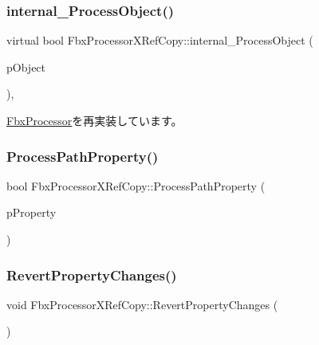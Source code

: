 \subsubsection{\texorpdfstring{internal\+\_\+\+Process\+Object()}{internal\_ProcessObject()}}
{\footnotesize\ttfamily virtual bool Fbx\+Processor\+X\+Ref\+Copy\+::internal\+\_\+\+Process\+Object (\begin{DoxyParamCaption}\item[{\hyperlink{class_fbx_object}{Fbx\+Object} $\ast$}]{p\+Object }\end{DoxyParamCaption})\hspace{0.3cm}{\ttfamily [protected]}, {\ttfamily [virtual]}}



\hyperlink{class_fbx_processor_ac549e7e8c678383831be8789a7c4ccdb}{Fbx\+Processor}を再実装しています。

\mbox{\label{class_fbx_processor_x_ref_copy_af29ec1373d66383d6b9140421c4c0166}} 
\subsubsection{\texorpdfstring{Process\+Path\+Property()}{ProcessPathProperty()}}
{\footnotesize\ttfamily bool Fbx\+Processor\+X\+Ref\+Copy\+::\+Process\+Path\+Property (\begin{DoxyParamCaption}\item[{\hyperlink{class_fbx_property}{Fbx\+Property} \&}]{p\+Property }\end{DoxyParamCaption})\hspace{0.3cm}{\ttfamily [protected]}}

\mbox{\label{class_fbx_processor_x_ref_copy_acb594ac9c10bdc9cf32efb2a64840654}} 
\subsubsection{\texorpdfstring{Revert\+Property\+Changes()}{RevertPropertyChanges()}}
{\footnotesize\ttfamily void Fbx\+Processor\+X\+Ref\+Copy\+::\+Revert\+Property\+Changes (\begin{DoxyParamCaption}{ }\end{DoxyParamCaption})}

